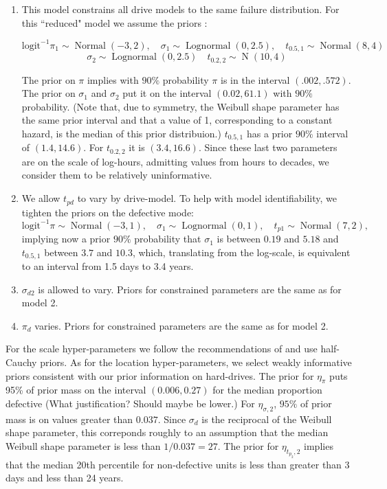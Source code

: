 \documentclass[12pt]{article}
\newcommand{\op}{\operatorname}
\begin{document}
\begin{enumerate}
\item This model constrains all drive models to the same failure distribution. For this ``reduced" model we assume the priors :

$$\mbox{logit}^{-1}\pi_1 \sim \op{Normal}(-3,2),\quad \sigma_1 \sim \op{Lognormal}(0, 2.5), \quad t_{0.5,1} \sim \op{Normal}(8,4)$$
$$\sigma_2 \sim \op{Lognormal}(0, 2.5) \quad t_{0.2,2} \sim \op{N}(10,4)$$

The prior on $\pi$ implies with $90\%$ probability $\pi$ is in the interval $(.002, .572)$. The prior on $\sigma_1$ and $\sigma_2$ put it on the interval $(0.02, 61.1)$ with $90\%$ probability. (Note that, due to symmetry, the Weibull shape parameter has the same prior interval and that a value of 1, corresponding to a constant hazard, is the median of this prior distribuion.) $t_{0.5,1}$ has a prior $90\%$ interval of $(1.4,14.6)$. For $t_{0.2,2}$ it is $(3.4,16.6)$. Since these last two parameters are on the scale of log-hours, admitting values from hours to decades, we consider them to be relatively uninformative.

\item We allow $t_{pd}$ to vary by drive-model. To help with model identifiability, we tighten the priors on the defective mode:
$$ \mbox{logit}^{-1}\pi \sim \op{Normal}(-3,1),\quad \sigma_1 \sim \op{Lognormal}(0, 1), \quad t_{p1} \sim \op{Normal}(7,2),$$
implying now a prior $90\%$ probability that $\sigma_1$ is between $0.19$ and $5.18$ and $t_{0.5,1}$ between $3.7$ and $10.3$, which, translating from the log-scale, is equivalent to an interval from 1.5 days to 3.4 years.

\item $\sigma_{d2}$ is allowed to vary. Priors for constrained parameters are the same as for model 2.

\item $\pi_d$ varies. Priors for constrained parameters are the same as for model 2.

\end{enumerate}

For the scale hyper-parameters we follow the recommendations of \citet{gelman2014bayesian} and use half-Cauchy priors. As for the location hyper-parameters, we select weakly informative priors consistent with our prior information on hard-drives. The prior for $\eta_\pi$ puts 95\% of prior mass on the interval $(0.006, 0.27)$ for the median proportion defective (What justification? Should maybe be lower.) For $\eta_{\sigma, 2}$, $95\%$ of prior mass is on values greater than $0.037$. Since $\sigma_d$ is the reciprocal of the Weibull shape parameter, this correponds roughly to an assumption that the median Weibull shape parameter is less than $1/0.037 = 27$. The prior for $\eta_{t_{p_2},2}$ implies that the median 20th percentile for non-defective units is less than greater than 3 days and less than 24 years.
\end{document}
